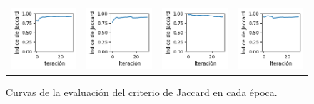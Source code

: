 \begin{figure}[!b]
\begin{tabular}{cccc}
        \includegraphics[width=3.5cm]{../Plots/score_epoch_12.png} &
        \includegraphics[width=3.5cm]{../Plots/score_epoch_13.png} &
        \includegraphics[width=3.5cm]{../Plots/score_epoch_14.png} &
        \includegraphics[width=3.5cm]{../Plots/score_epoch_15.png} \\
    \end{tabular}
    \caption{Curvas de la evaluación del criterio de Jaccard en cada época.}
    \label{fig:iou_epochs}
\end{figure}

